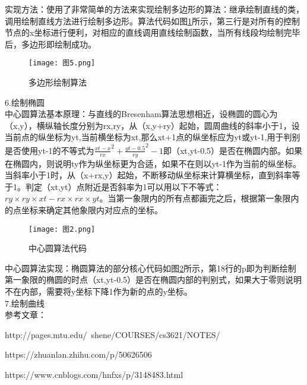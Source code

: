 \documentclass[a4paper,UTF8]{article}
\theoremstyle{definition}
\begin{document}
\indent{}实现方法：使用了非常简单的方法来实现绘制多边形的算法：继承绘制直线的类，调用绘制直线方法进行绘制多边形。算法代码如图\ref{fig:图2}所示，第三行是对所有的控制节点的x坐标进行便利，对相应的直线调用直线绘制函数，当所有线段均绘制完毕后，多边形即绘制成功。\\

\begin{figure}[b!]
   \centering
   \texttt{[image: 图5.png]} %
   \caption{多边形绘制算法}
   \label{fig:图2}
\end{figure}

\noindent{}6.绘制椭圆\\

\indent{}中心圆算法基本原理：与直线的Bresenham算法思想相近，设椭圆的圆心为（x,y），横纵轴长度分别为rx,ry，从（x,y+ry）起始，圆周曲线的斜率小于1，设当前点的纵坐标为yt,当前横坐标为xt,那么xt+1点的纵坐标应为yt或yt-1,用于判别是否使用yt-1的不等式为${\frac{xt-x}{rx}^2+{\frac{yt-0.5}{ry}}^2-1}$即（xt,yt-0.5）是否在椭圆内部。如果在椭圆内，则说明ty作为纵坐标更为合适，如果不在则以yt-1作为当前的纵坐标。当斜率小于1时，从（x+rx,y）起始，不断移动纵坐标来计算横坐标，直到斜率等于1。判定（xt,yt）点附近是否斜率为1可以用以下不等式：$ry\times{}ry\times{}xt-rx\times{}rx\times{}yt$。当第一象限内的所有点都画完之后，根据第一象限内的点坐标来确定其他象限内对应点的坐标。\\

\begin{figure}[b!]
   \centering
   \texttt{[image: 图2.png]} %
   \caption{中心圆算法代码}
   \label{fig:图3}
\end{figure}

\indent{}中心圆算法实现：椭圆算法的部分核心代码如图\ref{fig:图3}所示，第18行的p即为判断绘制第一象限的椭圆的时点（xt,yt-0.5）是否在椭圆内部的判别式，如果大于零则说明不在内部，需要将y坐标下降1作为新的点的y坐标。\\

\noindent{}7.绘制曲线\\

\indent{}参考文章：

http://pages.mtu.edu/~shene/COURSES/cs3621/NOTES/

https://zhuanlan.zhihu.com/p/50626506

https://www.cnblogs.com/hnfxs/p/3148483.html
\end{document}
